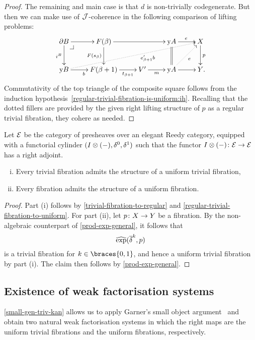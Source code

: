 \documentclass[reqno,10pt,a4paper,oneside]{amsart}
\begin{document}
\begin{proof}
The remaining and main case is that $d$ is non-trivially codegenerate.
But then we can make use of $\cal{J}$-coherence in the following comparison of lifting problems:
\[
\xymatrix{
  \partial B
  \ar[r]
  \ar[d]_{i^B}
  \pullback{dr}
&
  F(\beta)
  \ar[rr]
  \ar[d]_{F(s_{\beta})}
&&
  \yon A
  \ar[r]^{e}
  \ar@{=}[d]
&
  X
  \ar[d]^{p}
\\
  \yon B
  \ar[r]_{b}
  \ar@{.>}[urrrr]_(0.6){e_{\beta+1}' b}
&
  F(\beta+1)
  \ar[r]_-{t_{\beta+1}}
&
  V'
  \ar[r]_-{m}
&
  \yon A
  \ar[r]
  \ar@{.>}[ur]_{e}
&
  Y
\rlap{.}}
\]
Commutativity of the top triangle of the composite square follows from the induction hypothesis~\eqref{regular-trivial-fibration-is-uniform:ih}.
Recalling that the dotted fillers are provided by the given right lifting structure of $p$ as a regular trivial fibration, they cohere as needed.
\end{proof}

\begin{theorem} \label{thm:ac-kan-is-uniform} Let $\catE$ be the category of presheaves over an elegant Reedy category, equipped with a functorial cylinder $(\interval \otimes (-), \lcyl, \rcyl)$ such that the functor $\interval \otimes (-) \co \cal{E} \to \cal{E}$ has a right adjoint.
\begin{enumerate}[(i)]
\item Every trivial fibration admits the structure of a uniform trivial fibration,
\item Every fibration admits the structure of a uniform fibration.
\end{enumerate}
\end{theorem}

\begin{proof}
Part (i) follows by \cref{trivial-fibration-to-regular} and \cref{regular-trivial-fibration-to-uniform}.
For part (ii), let $p \co X \to Y$ be a fibration.
By the non-algebraic counterpart of \cref{prod-exp-general}, it follows that
\[
\hatexp(\overline{\delta}^k, p)
\]
is a trivial fibration for $k \in \braces{0, 1}$, and hence a uniform trivial fibration by part (i).
The claim then follows by \cref{prod-exp-general}.
\end{proof}



\subsection*{Existence of weak factorisation systems} \cref{small-gen-triv-kan} allows us to apply Garner's small object argument~\cite{garner:small-object-argument} and obtain two natural weak factorisation systems in which the right maps are the uniform trivial fibrations and the uniform fibrations, respectively.
\end{document}
